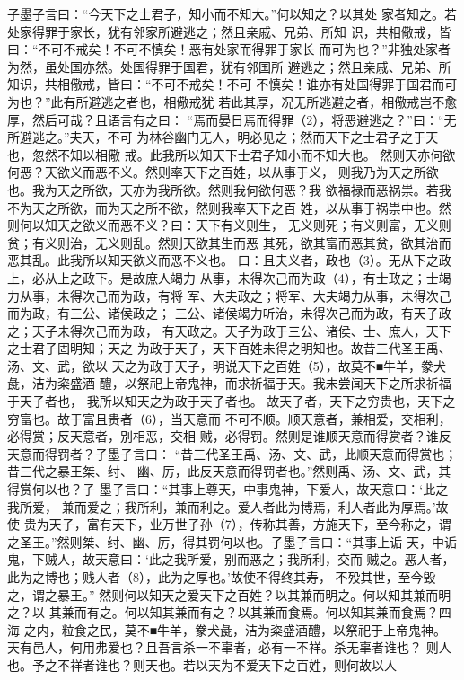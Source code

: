 \documentclass[12pt,UTF8]{ctexbook}
\begin{document}
子墨子言曰：“今天下之士君子，知小而不知大。”何以知之？以其处 
家者知之。若处家得罪于家长，犹有邻家所避逃之；然且亲戚、兄弟、所知 
识，共相儆戒，皆曰：“不可不戒矣！不可不慎矣！恶有处家而得罪于家长 
而可为也？”非独处家者为然，虽处国亦然。处国得罪于国君，犹有邻国所 
避逃之；然且亲戚、兄弟、所知识，共相儆戒，皆曰：“不可不戒矣！不可 
不慎矣！谁亦有处国得罪于国君而可为也？”此有所避逃之者也，相儆戒犹 
若此其厚，况无所逃避之者，相儆戒岂不愈厚，然后可哉？且语言有之曰： 
“焉而晏日焉而得罪（2），将恶避逃之？”曰：“无所避逃之。”夫天，不可 
为林谷幽门无人，明必见之；然而天下之士君子之于天也，忽然不知以相儆 
戒。此我所以知天下士君子知小而不知大也。 
然则天亦何欲何恶？天欲义而恶不义。然则率天下之百姓，以从事于义， 
则我乃为天之所欲也。我为天之所欲，天亦为我所欲。然则我何欲何恶？我 
欲福禄而恶祸祟。若我不为天之所欲，而为天之所不欲，然则我率天下之百 
姓，以从事于祸祟中也。然则何以知天之欲义而恶不义？曰：天下有义则生， 
无义则死；有义则富，无义则贫；有义则治，无义则乱。然则天欲其生而恶 
其死，欲其富而恶其贫，欲其治而恶其乱。此我所以知天欲义而恶不义也。 
曰：且夫义者，政也（3）。无从下之政上，必从上之政下。是故庶人竭力 
从事，未得次己而为政（4），有士政之；士竭力从事，未得次己而为政，有将 
军、大夫政之；将军、大夫竭力从事，未得次己而为政，有三公、诸侯政之； 
三公、诸侯竭力听治，未得次己而为政，有天子政之；天子未得次己而为政， 
有天政之。天子为政于三公、诸侯、士、庶人，天下之士君子固明知；天之 
为政于天子，天下百姓未得之明知也。故昔三代圣王禹、汤、文、武，欲以 
天之为政于天子，明说天下之百姓（5），故莫不■牛羊，豢犬彘，洁为粢盛酒 
醴，以祭祀上帝鬼神，而求祈福于天。我未尝闻天下之所求祈福于天子者也， 
我所以知天之为政于天子者也。 
故天子者，天下之穷贵也，天下之穷富也。故于富且贵者（6），当天意而 
不可不顺。顺天意者，兼相爱，交相利，必得赏；反天意者，别相恶，交相 
贼，必得罚。然则是谁顺天意而得赏者？谁反天意而得罚者？子墨子言曰： 
“昔三代圣王禹、汤、文、武，此顺天意而得赏也；昔三代之暴王桀、纣、 
幽、厉，此反天意而得罚者也。”然则禹、汤、文、武，其得赏何以也？子 
墨子言曰：“其事上尊天，中事鬼神，下爱人，故天意曰：‘此之我所爱， 
兼而爱之；我所利，兼而利之。爱人者此为博焉，利人者此为厚焉。’故使 
贵为天子，富有天下，业万世子孙（7），传称其善，方施天下，至今称之，谓 
之圣王。”然则桀、纣、幽、厉，得其罚何以也。子墨子言曰：“其事上诟 
天，中诟鬼，下贼人，故天意曰：‘此之我所爱，别而恶之；我所利，交而 
贼之。恶人者，此为之博也；贱人者（8），此为之厚也。’故使不得终其寿， 
不殁其世，至今毁之，谓之暴王。” 
然则何以知天之爱天下之百姓？以其兼而明之。何以知其兼而明之？以 
其兼而有之。何以知其兼而有之？以其兼而食焉。何以知其兼而食焉？四海 
之内，粒食之民，莫不■牛羊，豢犬彘，洁为粢盛酒醴，以祭祀于上帝鬼神。 
天有邑人，何用弗爱也？且吾言杀一不辜者，必有一不祥。杀无辜者谁也？ 
则人也。予之不祥者谁也？则天也。若以天为不爱天下之百姓，则何故以人 
\end{document}
